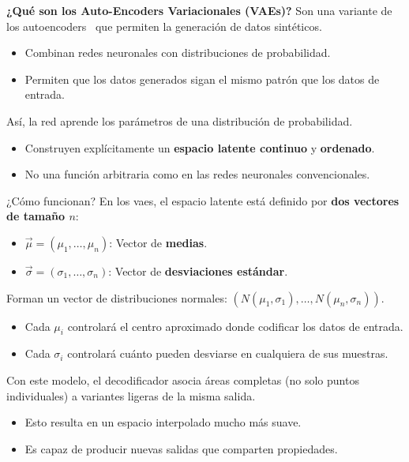 \begin{frame}{}

\textbf{¿Qué son los Auto-Encoders Variacionales (VAEs)?}
Son una variante de los autoencoders~\cite{kingma2019introduction} que permiten la generación de datos sintéticos.

\begin{itemize}
    \item Combinan redes neuronales con distribuciones de probabilidad.
    \item Permiten que los datos generados sigan el mismo patrón que los datos de entrada.
\end{itemize}

Así, la red aprende los parámetros de una distribución de probabilidad.

\begin{itemize}
    \item Construyen explícitamente un \textbf{espacio latente continuo} y \textbf{ordenado}.
    \item No una función arbitraria como en las redes neuronales convencionales.
\end{itemize}
\end{frame}

\begin{frame}{¿Cómo funcionan?}
En los \glspl{vae}, el espacio latente está definido por \textbf{dos vectores de tamaño $n$}:

\begin{itemize}
    \item $\vec{\mu} = (\mu_1, \ldots, \mu_n)$: Vector de \textbf{medias}.
    \item $\vec{\sigma} = (\sigma_1, \ldots, \sigma_n)$: Vector de \textbf{desviaciones estándar}.
\end{itemize}

Forman un vector de distribuciones normales: $(N(\mu_1,\sigma_1),\ldots ,N(\mu_n,\sigma_n))$.

\begin{itemize}
    \item Cada $\mu_i$ controlará el centro aproximado donde codificar los datos de entrada.
    \item Cada $\sigma_i$ controlará cuánto pueden desviarse en cualquiera de sus muestras.
\end{itemize}

Con este modelo, el decodificador asocia áreas completas (no solo puntos individuales) a variantes ligeras de la misma salida.

\begin{itemize}
    \item Esto resulta en un espacio interpolado mucho más suave.
    \item Es capaz de producir nuevas salidas que comparten propiedades.
\end{itemize}
\end{frame}

